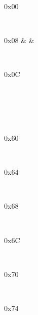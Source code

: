 \begin{figure}[h]
	\centering
	\begin{bytefield}[leftcurly=.,leftcurlyspace=0pt,bitwidth=0.03\linewidth]{32}
		 \\
		\begin{leftwordgroup}{0x00}
		\end{leftwordgroup} \\
		\begin{leftwordgroup}{0x08}
			 &  &
		\end{leftwordgroup} \\
		\begin{leftwordgroup}{0x0C}
		\end{leftwordgroup} \\

		 \\
		 \\
		 \\

		\begin{leftwordgroup}{0x60}
		\end{leftwordgroup} \\
		\begin{leftwordgroup}{0x64}
		\end{leftwordgroup} \\
		\begin{leftwordgroup}{0x68}
		\end{leftwordgroup} \\
		\begin{leftwordgroup}{0x6C}
		\end{leftwordgroup} \\
		\begin{leftwordgroup}{0x70}
		\end{leftwordgroup} \\
		\begin{leftwordgroup}{0x74}
		\end{leftwordgroup} \\


\end{bytefield}
\end{figure}
